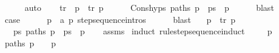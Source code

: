 \begin{isabellebody}
\ \ \ \ \isamarkupfalse%
\ auto\isanewline
\ \ \isamarkupfalse%
\ tr\ \ {\isacartoucheopen}p{\isacharprime}{\kern0pt}\ {\isasymmapsto}{\isachardollar}{\kern0pt}\ tr\ p{\isacharprime}{\kern0pt}{\isacharprime}{\kern0pt}{\isacartoucheclose}\isanewline
\ \ \ \ \isamarkupfalse%
\ Cons{\isachardot}{\kern0pt}hyps\ {\isacartoucheopen}paths\ {\isacharparenleft}{\kern0pt}p{\isacharprime}{\kern0pt}\ {\isacharhash}{\kern0pt}\ ps\ {\isacharat}{\kern0pt}\ {\isacharbrackleft}{\kern0pt}p{\isacharprime}{\kern0pt}{\isacharprime}{\kern0pt}{\isacharbrackright}{\kern0pt}{\isacharparenright}{\kern0pt}{\isacartoucheclose}\isanewline
\ \ \ \ \isamarkupfalse%
\ blast\isanewline
\ \ \isamarkupfalse%
\ \isamarkupfalse%
\ {\isacharquery}{\kern0pt}case\isanewline
\ \ \ \ \isamarkupfalse%
\ {\isacartoucheopen}p\ {\isasymmapsto}\ a\ p{\isacharprime}{\kern0pt}{\isacartoucheclose}\ step{\isacharunderscore}{\kern0pt}sequence{\isachardot}{\kern0pt}intros{\isacharparenleft}{\kern0pt}{}{\isacharparenright}{\kern0pt}\isanewline
\ \ \ \ \isamarkupfalse%
\ blast\isanewline
{}\isamarkupfalse%
%
\endisatagproof
{\isafoldproof}%
%
\isadelimproof
\isanewline
%
\endisadelimproof
\isanewline
{}\isamarkupfalse%
\isanewline
\ \ \ {\isacartoucheopen}p\ {\isasymmapsto}{\isachardollar}{\kern0pt}\ tr\ p{\isacharprime}{\kern0pt}{\isacharprime}{\kern0pt}{\isacartoucheclose}\isanewline
\ \ \ {\isacartoucheopen}{\isasymexists}ps{\isachardot}{\kern0pt}\ paths\ {\isacharparenleft}{\kern0pt}p\ {\isacharhash}{\kern0pt}\ ps\ {\isacharat}{\kern0pt}\ {\isacharbrackleft}{\kern0pt}p{\isacharprime}{\kern0pt}{\isacharprime}{\kern0pt}{\isacharbrackright}{\kern0pt}{\isacharparenright}{\kern0pt}{\isacartoucheclose}\isanewline
%
\isadelimproof
\ \ %
\endisadelimproof
%
\isatagproof
{}\isamarkupfalse%
\ assms\isanewline
{}\isamarkupfalse%
\ {\isacharparenleft}{\kern0pt}induct\ rule{\isacharcolon}{\kern0pt}step{\isacharunderscore}{\kern0pt}sequence{\isachardot}{\kern0pt}induct{\isacharparenright}{\kern0pt}\isanewline
\ \ \isamarkupfalse%
\ {\isacharparenleft}{\kern0pt}{}\ p{\isacharparenright}{\kern0pt}\isanewline
\ \ \isamarkupfalse%
\ {\isacartoucheopen}paths\ {\isacharparenleft}{\kern0pt}p\ {\isacharhash}{\kern0pt}\ {\isacharbrackleft}{\kern0pt}{\isacharbrackright}{\kern0pt}\ {\isacharat}{\kern0pt}\ {\isacharbrackleft}{\kern0pt}p{\isacharbrackright}{\kern0pt}{\isacharparenright}{\kern0pt}{\isacartoucheclose}\isanewline

\end{isabellebody}
